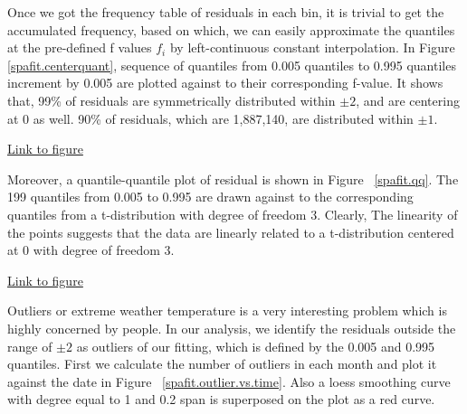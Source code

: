 Once we got the frequency table of residuals in each bin, it is trivial to get
the accumulated frequency, based on which, we can easily approximate the 
quantiles at the pre-defined f values $f_i$ by left-continuous constant 
interpolation. In Figure~
\href{../plots/a1950/spafit/d2/span0.015/a1950.residual.centerquant.pdf}
{\ref*{spafit.centerquant}}, sequence of quantiles from 0.005 quantiles to 0.995
quantiles increment by 0.005 are plotted against to their corresponding f-value.
It shows that, 99\% of residuals are symmetrically distributed within $\pm 2$, 
and are centering at 0 as well. 90\% of residuals, which are 1,887,140, are 
distributed within $\pm 1$.

\begin{framed}
\begin{center}
  \href{../plots/a1950/spafit/d2/span0.015/a1950.residual.centerquant.pdf}
  {Link to figure}
  \label{spafit.centerquant}
\end{center}
\end{framed}

Moreover, a quantile-quantile plot of residual is shown in Figure~
\href{../plots/a1950/spafit/d2/span0.015/a1950.residual.QQ.pdf}
{\ref*{spafit.qq}}. The 199 quantiles from 0.005 to 0.995 are drawn against to
the corresponding quantiles from a t-distribution with degree of freedom 3. 
Clearly, The linearity of the points suggests that the data are linearly related
to a t-distribution centered at 0 with degree of freedom 3.

\begin{framed}
\begin{center}
  \href{../plots/a1950/spafit/d2/span0.015/a1950.residual.QQ.pdf}
  {Link to figure}
  \label{spafit.qq}
\end{center}
\end{framed}

Outliers or extreme weather temperature is a very interesting problem which is
highly concerned by people. In our analysis, we identify the residuals outside
the range of $\pm 2$ as outliers of our fitting, which is defined by the 0.005
and 0.995 quantiles. First we calculate the number of outliers in each month and
plot it against the date in Figure~
\href{../plots/a1950/spafit/d2/span0.015/a1950.outliersCountvsTime.pdf}
{\ref*{spafit.outlier.vs.time}}. Also a loess smoothing curve with degree equal
to 1 and 0.2 span is superposed on the plot as a red curve.

